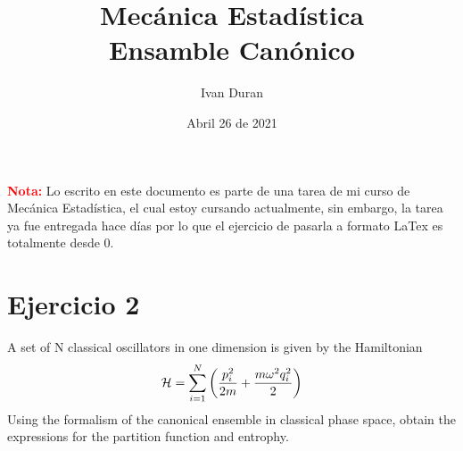 \documentclass[a4paper,10pt]{article}
\title{Mecánica Estadística\\Ensamble Canónico}
\author{Ivan Duran}
\date{Abril 26 de 2021}
\begin{document}
\maketitle

{\textbf{\textcolor{red}{Nota:}} Lo escrito en este documento es parte de una tarea de mi curso de Mecánica Estadística, el cual estoy cursando actualmente, sin embargo, la tarea ya fue entregada hace días por lo que el ejercicio de pasarla a formato LaTex es totalmente desde 0.
\section{Ejercicio 2}
A set of N classical oscillators in one dimension is given by the Hamiltonian
\begin{equation}
	\notag \mathcal{H}=\sum_{i=1}^N\left(\frac{p_i^2}{2m}+\frac{m\omega^2q_i^2}{2}\right)
\end{equation}
Using the formalism of the canonical ensemble in classical phase
space, obtain the expressions for the partition function and entrophy.

}
\end{document}
